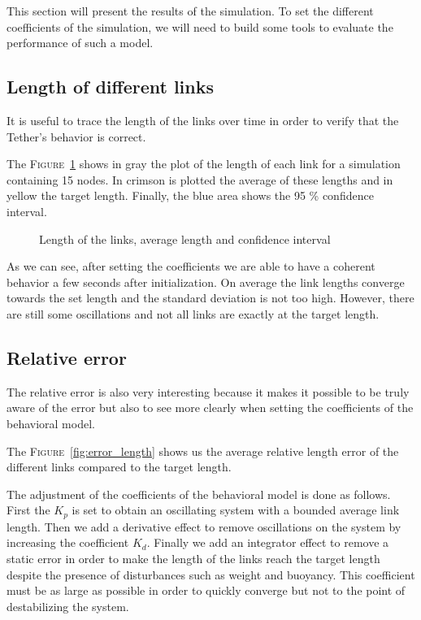 This section will present the results of the simulation. To set the different coefficients of the simulation, we will need to build some tools to evaluate the performance of such a model.
\subsection{Length of different links}

It is useful to trace the length of the links over time in order to verify that the Tether's behavior is correct.

The \textsc{Figure}~\ref{fig:length} shows in gray the plot of the length of each link for a simulation containing 15 nodes. In crimson is plotted the average of these lengths and in yellow the target length. Finally, the blue area shows the 95 \% confidence interval.

\begin{figure}
    \centering
    
    \caption{Length of the links, average length and confidence interval}
    \label{fig:length}
\end{figure}

As we can see, after setting the coefficients we are able to have a coherent behavior a few seconds after initialization. On average the link lengths converge towards the set length and the standard deviation is not too high. However, there are still some oscillations and not all links are exactly at the target length.

\subsection{Relative error}
The relative error is also very interesting because it makes it possible to be truly aware of the error but also to see more clearly when setting the coefficients of the behavioral model.

The \textsc{Figure}~\ref{fig:error_length} shows us the average relative length error of the different links compared to the target length.

The adjustment of the coefficients of the behavioral model is done as follows. First the $K_p$ is set to obtain an oscillating system with a bounded average link length. Then we add a derivative effect to remove oscillations on the system by increasing the coefficient $K_d$. Finally we add an integrator effect to remove a static error in order to make the length of the links reach the target length despite the presence of disturbances such as weight and buoyancy. This coefficient must be as large as possible in order to quickly converge but not to the point of destabilizing the system.

